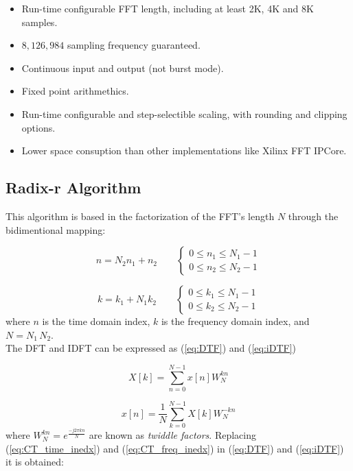 \documentclass[conference]{IEEEtran}
\begin{document}
\begin{itemize}
  \item Run-time configurable FFT length, including at least 2K, 4K and 8K samples.
  \item $8,126,984$ sampling frequency guaranteed.
  \item Continuous input and output (not burst mode).
  \item Fixed point arithmethics.
  \item Run-time configurable and step-selectible scaling, with rounding and clipping options.
  \item Lower space consuption than other implementations like Xilinx FFT IPCore.
\end{itemize}

\subsection{Radix-r Algorithm}

This algorithm is based in the factorization of the FFT's length $N$ through the bidimentional mapping: 

\begin{equation}
n = N_2n_1 + n_2 \qquad 
	\begin{cases}
	0\leq n_1 \leq N_1 -1 \\
	0\leq n_2 \leq N_2 -1
	\end{cases}
\label{eq:CT_time_inedx}
\end{equation}

\begin{equation}
k = k_1 + N_1k_2 \qquad 
	\begin{cases}
	0\leq k_1 \leq N_1 -1 \\
	0\leq k_2 \leq N_2 -1
	\end{cases}
\label{eq:CT_freq_inedx}
\end{equation}
where $n$ is the time domain index, $k$ is the frequency domain index, and $N=N_1 \, N_2$.\\
The DFT and IDFT can be expressed as (\ref{eq:DTF}) and (\ref{eq:iDTF})

\begin{equation}
X[k] = \sum_{n=0}^{N-1}x[n]W_N^{kn}
\label{eq:DTF}
\end{equation}

\begin{equation}
x[n] = \frac{1}{N}\sum_{k=0}^{N-1}X[k]W_N^{-kn}
\label{eq:iDTF}
\end{equation}
where $W_N^{kn}=e^{\frac{-j2\pi kn}{N}}$ are known as \emph{twiddle factors}. 
Replacing (\ref{eq:CT_time_inedx}) and (\ref{eq:CT_freq_inedx}) in (\ref{eq:DTF}) and (\ref{eq:iDTF}) it is obtained:
\end{document}
